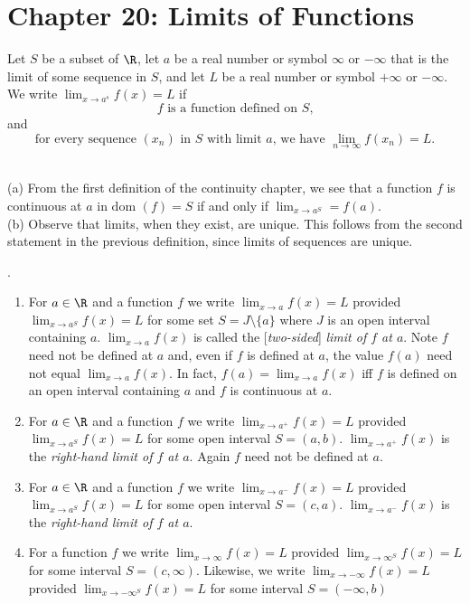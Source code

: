 \documentclass[twoside, 10pt]{article}
\newcommand{\dom}{\text{dom }}
\begin{document}
\section*{Chapter 20: Limits of Functions}
\begin{defn}
Let $S$ be a subset of $\R$, let $a$ be a real number or symbol $\infty$ or $-\infty$ that is the limit of some sequence in $S$, and let $L$ be a real number or symbol $+\infty$ or $-\infty$. We write $\lim_{x\to a^s}f(x)=L$ if 
\begin{equation*}
    \text{$f$ is a function defined on $S$,}
\end{equation*}
and
\begin{equation*}
    \text{for every sequence $(x_n)$ in $S$ with limit $a$, we have $\lim_{n\to\infty}f(x_n) = L$.}
\end{equation*}
\end{defn}

\begin{rmk}\ \\
(a) From the first definition of the continuity chapter, we see that a function $f$ is continuous at $a$ in $\dom(f) = S$ if and only if $\lim_{x\to a^S} = f(a)$.\\
(b) Observe that limits, when they exist, are unique. This follows from the second statement in the previous definition, since limits of sequences are unique.
\end{rmk}

\begin{defn}.
\begin{enumerate}
    \item For $a\in\R$ and a function $f$ we write $\lim_{x\to a}f(x)=L$ provided $\lim_{x\to a^S}f(x)=L$ for some set $S= J\setminus \{a\}$ where $J$ is an open interval containing $a$. $\lim_{x\to a}f(x)$ is called the [\emph{two-sided}] \emph{limit of $f$ at $a$}. Note $f$ need not be defined at $a$ and, even if $f$ is defined at $a$, the value $f(a)$ need not equal $\lim_{x\to a}f(x)$. In fact, $f(a) = \lim_{x\to a}f(x)$ iff $f$ is defined on an open interval containing $a$ and $f$ is continuous at $a$.
    
    \item For $a\in\R$ and a function $f$ we write $\lim_{x\to a^+}f(x) = L$ provided $\lim_{x\to a^S}f(x) = L$ for some open interval $S= (a,b)$. $\lim_{x\to a^+}f(x)$ is the \emph{right-hand limit of $f$ at $a$}. Again $f$ need not be defined at $a$.
    
    \item For $a\in\R$ and a function $f$ we write $\lim_{x\to a^-}f(x) = L$ provided $\lim_{x\to a^S}f(x) = L$ for some open interval $S= (c, a)$. $\lim_{x\to a^-}f(x)$ is the \emph{right-hand limit of $f$ at $a$}.
    
    \item For a function $f$ we write $\lim_{x\to\infty}f(x) = L$ provided $\lim_{x\to\infty^S} f(x) = L$ for some interval $S = (c, \infty)$. Likewise, we write $\lim_{x\to-\infty}f(x) = L$ provided $\lim_{x\to-\infty^S}f(x) = L$ for some interval $S=(-\infty, b)$
\end{enumerate}
\end{defn}
\end{document}
